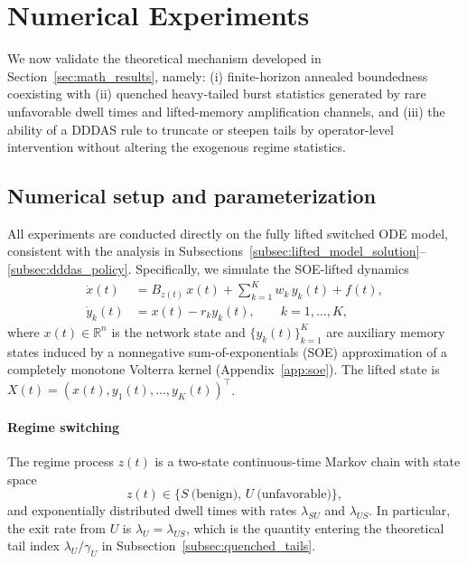\documentclass[12pt,a4paper]{article}
\theoremstyle{definition}
\theoremstyle{remark}
\begin{document}
\section{Numerical Experiments}
\label{sec:numerics}

We now validate the theoretical mechanism developed in
Section~\ref{sec:math_results}, namely: (i) finite-horizon annealed boundedness
coexisting with (ii) quenched heavy-tailed burst statistics generated by rare
unfavorable dwell times and lifted-memory amplification channels, and (iii) the
ability of a DDDAS rule to truncate or steepen tails by operator-level
intervention without altering the exogenous regime statistics.

\subsection{Numerical setup and parameterization}
\label{subsec:numerical_setup}

All experiments are conducted directly on the fully lifted switched ODE model,
consistent with the analysis in
Subsections~\ref{subsec:lifted_model_solution}--\ref{subsec:dddas_policy}.
Specifically, we simulate the SOE-lifted dynamics
\begin{equation}
	\label{eq:sim_base_lifted}
	\begin{aligned}
		\dot{x}(t) &= B_{z(t)}\,x(t) + \sum_{k=1}^{K} w_k\,y_k(t) + f(t),\\
		\dot{y}_k(t) &= x(t) - r_k y_k(t), \qquad k=1,\dots,K,
	\end{aligned}
\end{equation}
where $x(t)\in\mathbb{R}^n$ is the network state and $\{y_k(t)\}_{k=1}^K$ are
auxiliary memory states induced by a nonnegative sum-of-exponentials (SOE)
approximation of a completely monotone Volterra kernel (Appendix~\ref{app:soe}).
The lifted state is $X(t)=(x(t),y_1(t),\dots,y_K(t))^\top$.

\paragraph{Regime switching}
The regime process $z(t)$ is a two-state continuous-time Markov chain with
state space
\[
z(t)\in\{S \ \text{(benign)},\, U \ \text{(unfavorable)}\},
\]
and exponentially distributed dwell times with rates $\lambda_{SU}$ and
$\lambda_{US}$. In particular, the exit rate from $U$ is $\lambda_U=\lambda_{US}$,
which is the quantity entering the theoretical tail index
$\lambda_U/\gamma_U$ in Subsection~\ref{subsec:quenched_tails}.
\end{document}
